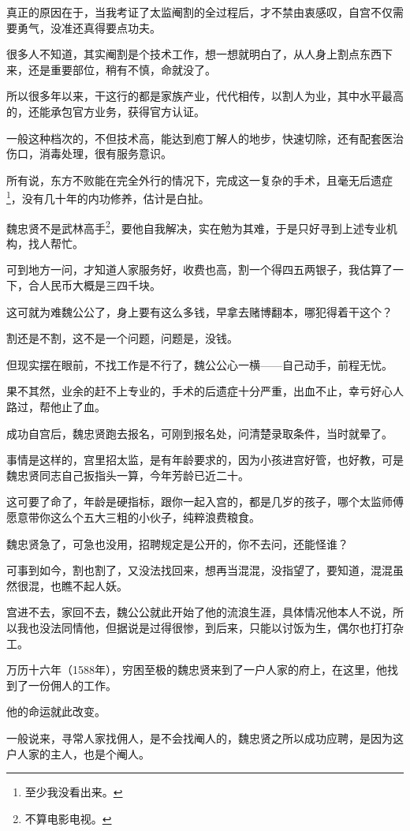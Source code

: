 \begin{multicols}{\theparacolNo}
		真正的原因在于，当我考证了太监阉割的全过程后，才不禁由衷感叹，自宫不仅需要勇气，没准还真得要点功夫。

		很多人不知道，其实阉割是个技术工作，想一想就明白了，从人身上割点东西下来，还是重要部位，稍有不慎，命就没了。

		所以很多年以来，干这行的都是家族产业，代代相传，以割人为业，其中水平最高的，还能承包官方业务，获得官方认证。

		一般这种档次的，不但技术高，能达到庖丁解人的地步，快速切除，还有配套医治伤口，消毒处理，很有服务意识。

		所有说，东方不败能在完全外行的情况下，完成这一复杂的手术，且毫无后遗症\footnote{至少我没看出来。}，没有几十年的内功修养，估计是白扯。

		魏忠贤不是武林高手\footnote{不算电影电视。}，要他自我解决，实在勉为其难，于是只好寻到上述专业机构，找人帮忙。

		可到地方一问，才知道人家服务好，收费也高，割一个得四五两银子，我估算了一下，合人民币大概是三四千块。

		这可就为难魏公公了，身上要有这么多钱，早拿去赌博翻本，哪犯得着干这个？

		割还是不割，这不是一个问题，问题是，没钱。

		但现实摆在眼前，不找工作是不行了，魏公公心一横——自己动手，前程无忧。

		果不其然，业余的赶不上专业的，手术的后遗症十分严重，出血不止，幸亏好心人路过，帮他止了血。

		成功自宫后，魏忠贤跑去报名，可刚到报名处，问清楚录取条件，当时就晕了。

		事情是这样的，宫里招太监，是有年龄要求的，因为小孩进宫好管，也好教，可是魏忠贤同志自己扳指头一算，今年芳龄已近二十。

		这可要了命了，年龄是硬指标，跟你一起入宫的，都是几岁的孩子，哪个太监师傅愿意带你这么个五大三粗的小伙子，纯粹浪费粮食。

		魏忠贤急了，可急也没用，招聘规定是公开的，你不去问，还能怪谁？

		可事到如今，割也割了，又没法找回来，想再当混混，没指望了，要知道，混混虽然很混，也瞧不起人妖。

		宫进不去，家回不去，魏公公就此开始了他的流浪生涯，具体情况他本人不说，所以我也没法同情他，但据说是过得很惨，到后来，只能以讨饭为生，偶尔也打打杂工。

		万历十六年（1588年），穷困至极的魏忠贤来到了一户人家的府上，在这里，他找到了一份佣人的工作。

		他的命运就此改变。

		一般说来，寻常人家找佣人，是不会找阉人的，魏忠贤之所以成功应聘，是因为这户人家的主人，也是个阉人。


\end{multicols}

